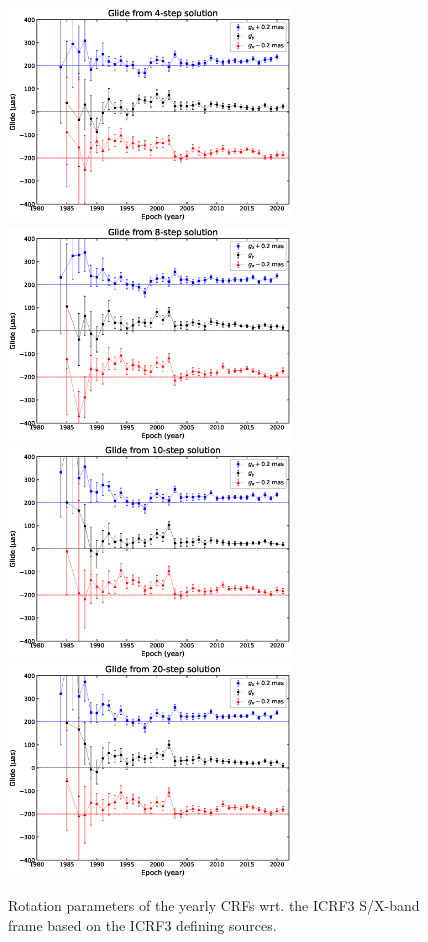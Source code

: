 \documentclass{aa-note}    %
\begin{document}
 \begin{figure}[hbtp]
   \centering
   \includegraphics[width=75mm]{figs/glide-from-yearly-ts-nju} 
   \includegraphics[width=75mm]{figs/glide-from-yearly-ts-nju-8step} \\
   \includegraphics[width=75mm]{figs/glide-from-yearly-ts-nju-10step} 
   \includegraphics[width=75mm]{figs/glide-from-yearly-ts-nju-20step}  
   \caption[]{\label{fig:glide-plot} %
   Rotation parameters of the yearly CRFs wrt. the ICRF3 S/X-band frame based on the ICRF3 defining sources.
   }
 \end{figure}
\end{document}
